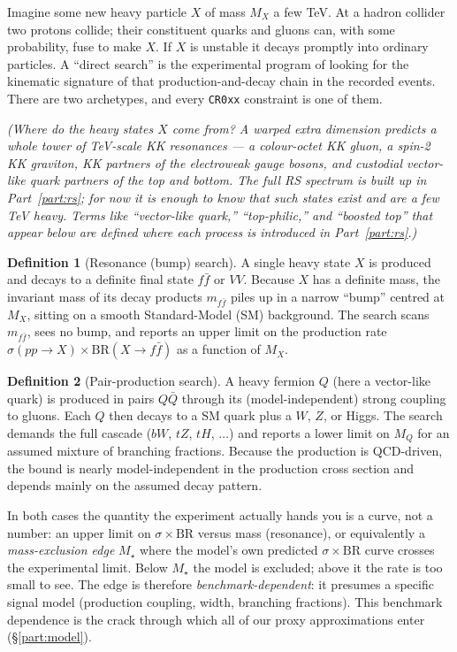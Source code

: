 \documentclass[11pt]{article}
\newcommand{\sBR}{\sigma\!\times\!\mathrm{BR}}
\newcommand{\code}[1]{\texttt{#1}}
\theoremstyle{definition}
\newtheorem{definition}{Definition}
\begin{document}
Imagine some new heavy particle $X$ of mass $M_X$ a few TeV. At a hadron
collider two protons collide; their constituent quarks and gluons can, with some
probability, fuse to make $X$. If $X$ is unstable it decays promptly into
ordinary particles. A ``direct search'' is the experimental program of looking
for the kinematic signature of that production-and-decay chain in the recorded
events. There are two archetypes, and every \code{CR0xx} constraint is one of
them.

\emph{(Where do the heavy states $X$ come from? A warped extra dimension predicts
a whole tower of TeV-scale KK resonances --- a colour-octet KK gluon, a spin-2 KK
graviton, KK partners of the electroweak gauge bosons, and custodial vector-like
quark partners of the top and bottom. The full RS spectrum is built up in
Part~\ref{part:rs}; for now it is enough to know that such states exist and are a
few TeV heavy. Terms like ``vector-like quark,'' ``top-philic,'' and ``boosted
top'' that appear below are defined where each process is introduced in
Part~\ref{part:rs}.)}

\begin{definition}[Resonance (bump) search]
A single heavy state $X$ is produced and decays to a definite final state
$f\bar f$ or $VV$. Because $X$ has a definite mass, the invariant mass of its
decay products $m_{f\bar f}$ piles up in a narrow ``bump'' centred at $M_X$,
sitting on a smooth Standard-Model (SM) background. The search scans $m_{f\bar
f}$, sees no bump, and reports an upper limit on the production rate
$\sigma(pp\to X)\times \mathrm{BR}(X\to f\bar f)$ as a function of $M_X$.
\end{definition}

\begin{definition}[Pair-production search]
A heavy fermion $Q$ (here a vector-like quark) is produced in pairs $Q\bar Q$
through its (model-independent) strong coupling to gluons. Each $Q$ then decays
to a SM quark plus a $W$, $Z$, or Higgs. The search demands the full cascade
($b W$, $t Z$, $t H$, $\dots$) and reports a lower limit on $M_Q$ for an assumed
mixture of branching fractions. Because the production is QCD-driven, the bound
is nearly model-independent in the production cross section and depends mainly on
the assumed decay pattern.
\end{definition}

In both cases the quantity the experiment actually hands you is a curve, not a
number: an upper limit on $\sBR$ versus mass (resonance), or equivalently a
\emph{mass-exclusion edge} $M_\star$ where the model's own predicted $\sBR$ curve
crosses the experimental limit. Below $M_\star$ the model is excluded; above it
the rate is too small to see. The edge is therefore \emph{benchmark-dependent}:
it presumes a specific signal model (production coupling, width, branching
fractions). This benchmark dependence is the crack through which all of our
proxy approximations enter (\S\ref{part:model}).
\end{document}
